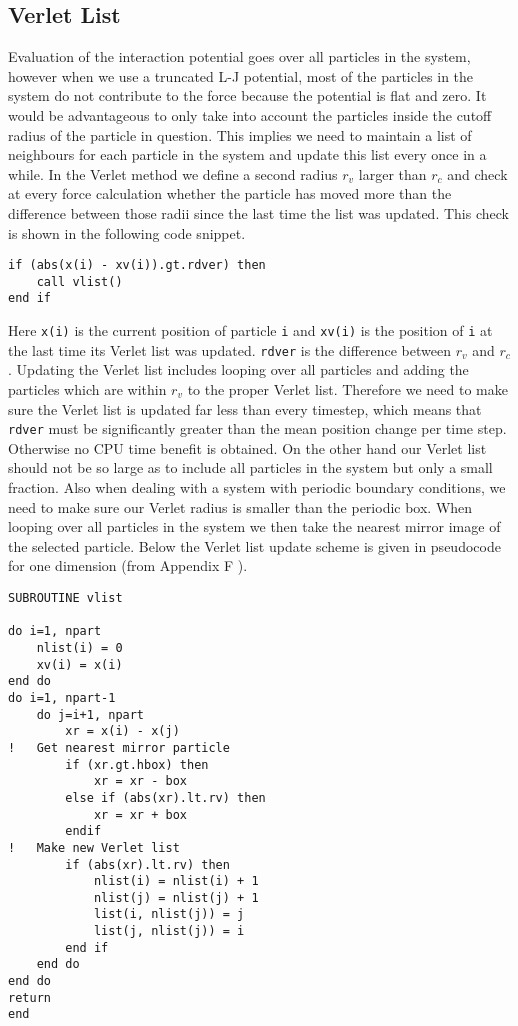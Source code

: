\documentclass[a4paper]{article}
\begin{document}
\subsection{Verlet List}
Evaluation of the interaction potential goes over all particles in the system, however when we use a
truncated L-J potential, most of the particles in the system do not contribute to the force because
the potential is flat and zero. It would be advantageous to only take into account the particles
inside the cutoff radius of the particle in question. This implies we need to maintain a list of
neighbours for each particle in the system and update this list every once in a while. In the Verlet
method we define a second radius $r_v$ larger than $r_c$ and check at every force calculation
whether the particle has moved more than the difference between those radii since the last time the
list was updated. This check is shown in the following code snippet.
\begin{verbatim}
if (abs(x(i) - xv(i)).gt.rdver) then
    call vlist()
end if
\end{verbatim}

Here \texttt{x(i)} is the current position of particle \texttt{i} and
\texttt{xv(i)} is the position of \texttt{i} at the last time its Verlet
list was updated. \texttt{rdver} is the difference between $r_v$ and $r_c$. Updating
the Verlet list includes looping over all particles and adding the particles which are within $r_v$
to the proper Verlet list. Therefore we need to make sure the Verlet list is updated far less than
every timestep, which means that \texttt{rdver} must be significantly greater than the
mean position change per time step. Otherwise no CPU time benefit is obtained. On the other hand our
Verlet list should not be so large as to include all particles in the system but only a small
fraction. Also when dealing with a system with periodic boundary conditions, we need to make sure
our Verlet radius is smaller than the periodic box. When looping over all particles in the system we
then take the nearest mirror image of the selected particle. Below the Verlet list update scheme is
given in pseudocode for one dimension (from Appendix F \cite{molsim}).

\pagebreak

\begin{verbatim}
SUBROUTINE vlist

do i=1, npart
    nlist(i) = 0
    xv(i) = x(i)
end do
do i=1, npart-1
    do j=i+1, npart
        xr = x(i) - x(j)
!   Get nearest mirror particle
        if (xr.gt.hbox) then
            xr = xr - box
        else if (abs(xr).lt.rv) then
            xr = xr + box
        endif
!   Make new Verlet list
        if (abs(xr).lt.rv) then
            nlist(i) = nlist(i) + 1
            nlist(j) = nlist(j) + 1
            list(i, nlist(j)) = j
            list(j, nlist(j)) = i
        end if
    end do
end do
return
end
\end{verbatim}
\end{document}
